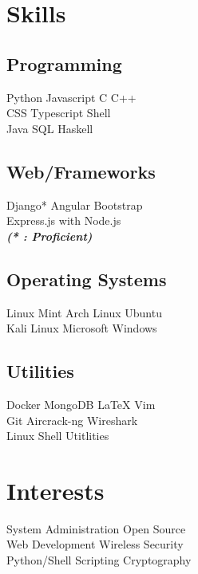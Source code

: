 \documentclass[]{deedy-resume-openfont}
\begin{document}
\begin{minipage}[t]{0.31\textwidth}
\section{Skills}
\subsection{Programming}
Python \textbullet{} Javascript \textbullet{} C \textbullet{} C++ \\
CSS \textbullet{} Typescript \textbullet{} Shell \\
 \vspace{0.1 cm}
 Java \textbullet{} SQL \textbullet{} Haskell \\
\vspace{0.3 cm} 
\subsection{Web/Frameworks}
Django* \textbullet{} Angular \textbullet{} Bootstrap \\
Express.js with Node.js \\
{\footnotesize \textit{\textbf{ (* : Proficient)}}}
\vspace{0.3 cm}
\subsection{Operating Systems}
Linux Mint \textbullet{} Arch Linux \textbullet{} Ubuntu \\
Kali Linux \textbullet{} Microsoft Windows
\vspace{0.3 cm}
\subsection{Utilities}
Docker \textbullet{} MongoDB \textbullet{} \LaTeX{} \textbullet{} Vim \\
Git \textbullet{} Aircrack-ng \textbullet{} Wireshark \\
Linux Shell Utitlities


\section{Interests}
System Administration \textbullet{}Open Source \\
Web Development \textbullet{} Wireless Security \\
Python/Shell Scripting  \textbullet{} Cryptography\\
%
%

\end{minipage} 
\end{document}

